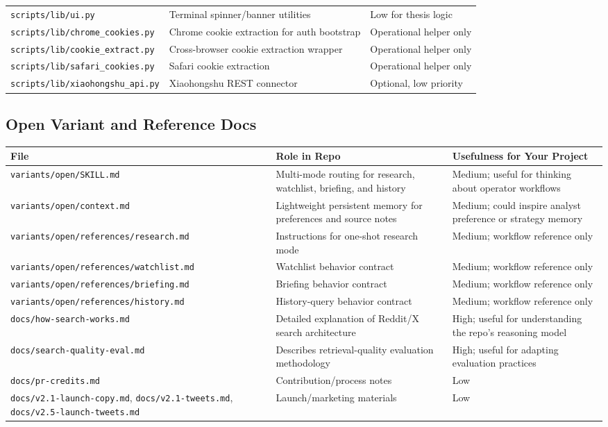 \documentclass[11pt, letterpaper]{article}
\begin{document}
\begin{longtable}{p{4.0cm}p{4.6cm}p{5.0cm}}
\texttt{scripts/lib/ui.py} & Terminal spinner/banner utilities & Low for thesis logic \\
\texttt{scripts/lib/chrome\_cookies.py} & Chrome cookie extraction for auth bootstrap & Operational helper only \\
\texttt{scripts/lib/cookie\_extract.py} & Cross-browser cookie extraction wrapper & Operational helper only \\
\texttt{scripts/lib/safari\_cookies.py} & Safari cookie extraction & Operational helper only \\
\texttt{scripts/lib/xiaohongshu\_api.py} & Xiaohongshu REST connector & Optional, low priority \\
\bottomrule
\end{longtable}

\subsection{Open Variant and Reference Docs}

\begin{longtable}{p{4.0cm}p{4.9cm}p{4.7cm}}
\toprule
\textbf{File} & \textbf{Role in Repo} & \textbf{Usefulness for Your Project} \\
\midrule
\endhead
\texttt{variants/open/SKILL.md} & Multi-mode routing for research, watchlist, briefing, and history & Medium; useful for thinking about operator workflows \\
\texttt{variants/open/context.md} & Lightweight persistent memory for preferences and source notes & Medium; could inspire analyst preference or strategy memory \\
\texttt{variants/open/references/research.md} & Instructions for one-shot research mode & Medium; workflow reference only \\
\texttt{variants/open/references/watchlist.md} & Watchlist behavior contract & Medium; workflow reference only \\
\texttt{variants/open/references/briefing.md} & Briefing behavior contract & Medium; workflow reference only \\
\texttt{variants/open/references/history.md} & History-query behavior contract & Medium; workflow reference only \\
\texttt{docs/how-search-works.md} & Detailed explanation of Reddit/X search architecture & High; useful for understanding the repo's reasoning model \\
\texttt{docs/search-quality-eval.md} & Describes retrieval-quality evaluation methodology & High; useful for adapting evaluation practices \\
\texttt{docs/pr-credits.md} & Contribution/process notes & Low \\
\texttt{docs/v2.1-launch-copy.md}, \texttt{docs/v2.1-tweets.md}, \texttt{docs/v2.5-launch-tweets.md} & Launch/marketing materials & Low \\
\bottomrule
\end{longtable}
\end{document}
